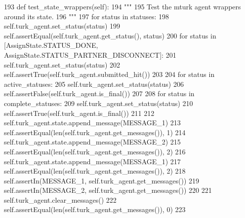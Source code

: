 \begin{DoxyCode}
193     \textcolor{keyword}{def }test\_state\_wrappers(self):
194         \textcolor{stringliteral}{"""}
195 \textcolor{stringliteral}{        Test the mturk agent wrappers around its state.}
196 \textcolor{stringliteral}{        """}
197         \textcolor{keywordflow}{for} status \textcolor{keywordflow}{in} statuses:
198             self.turk\_agent.set\_status(status)
199             self.assertEqual(self.turk\_agent.get\_status(), status)
200         \textcolor{keywordflow}{for} status \textcolor{keywordflow}{in} [AssignState.STATUS\_DONE, AssignState.STATUS\_PARTNER\_DISCONNECT]:
201             self.turk\_agent.set\_status(status)
202             self.assertTrue(self.turk\_agent.submitted\_hit())
203 
204         \textcolor{keywordflow}{for} status \textcolor{keywordflow}{in} active\_statuses:
205             self.turk\_agent.set\_status(status)
206             self.assertFalse(self.turk\_agent.is\_final())
207 
208         \textcolor{keywordflow}{for} status \textcolor{keywordflow}{in} complete\_statuses:
209             self.turk\_agent.set\_status(status)
210             self.assertTrue(self.turk\_agent.is\_final())
211 
212         self.turk\_agent.state.append\_message(MESSAGE\_1)
213         self.assertEqual(len(self.turk\_agent.get\_messages()), 1)
214         self.turk\_agent.state.append\_message(MESSAGE\_2)
215         self.assertEqual(len(self.turk\_agent.get\_messages()), 2)
216         self.turk\_agent.state.append\_message(MESSAGE\_1)
217         self.assertEqual(len(self.turk\_agent.get\_messages()), 2)
218         self.assertIn(MESSAGE\_1, self.turk\_agent.get\_messages())
219         self.assertIn(MESSAGE\_2, self.turk\_agent.get\_messages())
220 
221         self.turk\_agent.clear\_messages()
222         self.assertEqual(len(self.turk\_agent.get\_messages()), 0)
223 
\end{DoxyCode}
\mbox{\label{classparlai_1_1mturk_1_1core_1_1dev_1_1test_1_1test__mturk__agent_1_1TestMTurkAgent_aca082e5e552594724894f01f7dbc246b}} 
